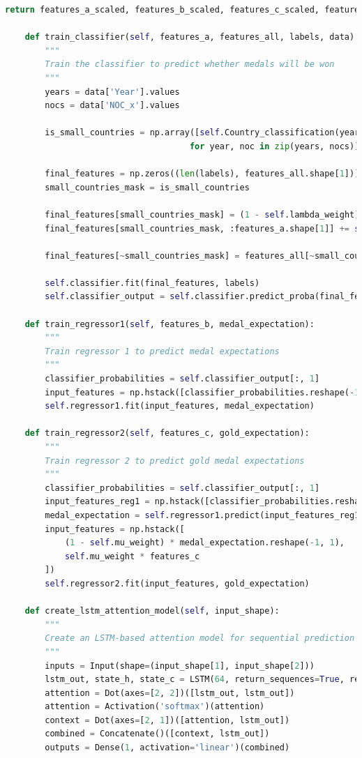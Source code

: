 \documentclass[12pt]{article}
\begin{document}
\begin{lstlisting}[language=Python, style=mystyle, caption=model.ipynb]
        return features_a_scaled, features_b_scaled, features_c_scaled, features_all_scaled, labels, medal_expectation, gold_expectation

    def train_classifier(self, features_a, features_all, labels, data):
        """
        Train the classifier to predict whether medals will be won
        """
        years = data['Year'].values
        nocs = data['NOC_x'].values

        is_small_countries = np.array([self.Country_classification(year, noc, data) 
                                     for year, noc in zip(years, nocs)])

        final_features = np.zeros((len(labels), features_all.shape[1]))
        small_countries_mask = is_small_countries

        final_features[small_countries_mask] = (1 - self.lambda_weight) * features_all[small_countries_mask]
        final_features[small_countries_mask, :features_a.shape[1]] += self.lambda_weight * features_a[small_countries_mask]

        final_features[~small_countries_mask] = features_all[~small_countries_mask]

        self.classifier.fit(final_features, labels)
        self.classifier_output = self.classifier.predict_proba(final_features)

    def train_regressor1(self, features_b, medal_expectation):
        """
        Train regressor 1 to predict medal expectations
        """
        classifier_probabilities = self.classifier_output[:, 1]
        input_features = np.hstack([classifier_probabilities.reshape(-1, 1), features_b])
        self.regressor1.fit(input_features, medal_expectation)

    def train_regressor2(self, features_c, gold_expectation):
        """
        Train regressor 2 to predict gold medal expectations
        """
        classifier_probabilities = self.classifier_output[:, 1]
        input_features_reg1 = np.hstack([classifier_probabilities.reshape(-1, 1), features_c])
        medal_expectation = self.regressor1.predict(input_features_reg1)
        input_features = np.hstack([
            (1 - self.mu_weight) * medal_expectation.reshape(-1, 1),
            self.mu_weight * features_c
        ])
        self.regressor2.fit(input_features, gold_expectation)

    def create_lstm_attention_model(self, input_shape):
        """
        Create an LSTM-based attention model for sequential prediction
        """
        inputs = Input(shape=(input_shape[1], input_shape[2]))
        lstm_out, state_h, state_c = LSTM(64, return_sequences=True, return_state=True)(inputs)
        attention = Dot(axes=[2, 2])([lstm_out, lstm_out])
        attention = Activation('softmax')(attention)
        context = Dot(axes=[2, 1])([attention, lstm_out])
        combined = Concatenate()([context, lstm_out])
        outputs = Dense(1, activation='linear')(combined)


\end{lstlisting}
\end{document}
